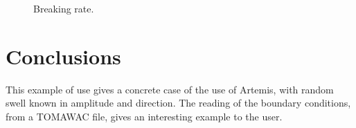 \begin{figure}[h]
\begin{center}
\end{center}
\caption{Breaking rate.}
\label{fig:flam_qb}
\end{figure}

\section{Conclusions}

This example of use gives a concrete case of the use of Artemis, with random swell
known in amplitude and direction. The reading of the boundary conditions, from a
TOMAWAC file, gives an interesting example to the user.
